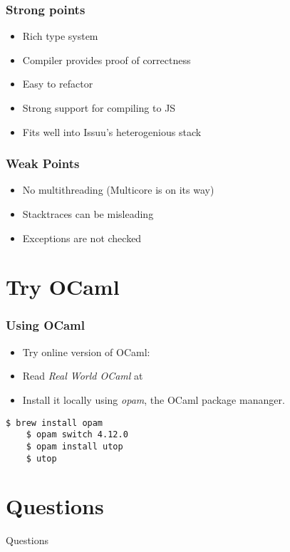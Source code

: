 \documentclass[xcolor=svgnames]{beamer}
\renewcommand{\emph}[1]{{\em #1}}
\renewcommand{\_}{\mathunderscore}
\begin{document}
\begin{frame}[fragile]
  \frametitle{Strong points}
  \begin{itemize}
  \item Rich type system
  \item Compiler provides proof of correctness
  \item Easy to refactor
  \item Strong support for compiling to JS
  \item Fits well into Issuu's heterogenious stack
  \end{itemize}
\end{frame}

\begin{frame}[fragile]
  \frametitle{Weak Points}
  \begin{itemize}
  \item No multithreading (Multicore is on its way)
  \item Stacktraces can be misleading
  \item Exceptions are not checked
  \end{itemize}
\end{frame}

\section{Try OCaml}
\begin{frame}[fragile]
  \frametitle{Using OCaml}
  \begin{itemize}
    \item Try online version of OCaml: 
    \item Read \emph{Real World OCaml} at 
    \item Install it locally using \emph{opam}, the OCaml package mananger.
  \end{itemize}
  \begin{lstlisting}[numbers=none,frame=none]
    $ brew install opam
    $ opam switch 4.12.0
    $ opam install utop
    $ utop
  \end{lstlisting}
\end{frame}

\section{Questions}

\begin{frame}[fragile]
  \begin{center}
    \LARGE Questions
  \end{center}
\end{frame}
\end{document}
